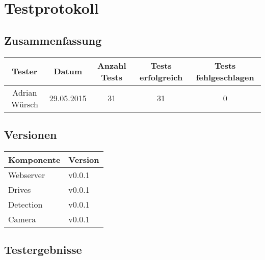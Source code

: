 \section{Testprotokoll}

\subsection{Zusammenfassung}

\begin{table}[h!]
	\centering
	\renewcommand{\arraystretch}{1.5}
	\begin{tabular}{|c|c|c|c|c|}
		\hline \textbf{Tester} & \textbf{Datum} & \textbf{Anzahl Tests} & \textbf{Tests erfolgreich} & \textbf{Tests fehlgeschlagen} \\
		\hline Adrian Würsch & 29.05.2015 & 31 & 31 & 0 \\ 
		\hline 
	\end{tabular}
\end{table}

\subsection{Versionen}

\begin{table}[h!]
	\centering
	\renewcommand{\arraystretch}{1.5}
	\begin{tabular}{|l|l|}
		\hline \textbf{Komponente} & \textbf{Version} \\
		\hline Webserver & v0.0.1 \\
		\hline Drives & v0.0.1 \\
		\hline Detection & v0.0.1 \\
		\hline Camera & v0.0.1 \\
		\hline 
	\end{tabular}
\end{table}

\newpage
\subsection{Testergebnisse}

